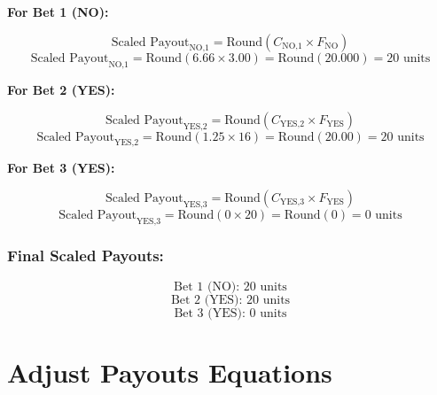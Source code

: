 \documentclass{article}
\begin{document}
\textbf{For Bet 1 (NO):}

\[
\text{Scaled Payout}_{\text{NO,1}} = \text{Round}(C_{\text{NO,1}} \times F_{\text{NO}})
\]
\[
\text{Scaled Payout}_{\text{NO,1}} = \text{Round}(6.66 \times 3.00) = \text{Round}(20.000) = 20 \text{ units}
\]

\textbf{For Bet 2 (YES):}

\[
\text{Scaled Payout}_{\text{YES,2}} = \text{Round}(C_{\text{YES,2}} \times F_{\text{YES}})
\]
\[
\text{Scaled Payout}_{\text{YES,2}} = \text{Round}(1.25 \times 16) = \text{Round}(20.00) = 20 \text{ units}
\]

\textbf{For Bet 3 (YES):}

\[
\text{Scaled Payout}_{\text{YES,3}} = \text{Round}(C_{\text{YES,3}} \times F_{\text{YES}})
\]
\[
\text{Scaled Payout}_{\text{YES,3}} = \text{Round}(0 \times 20) = \text{Round}(0) = 0 \text{ units}
\]

\subsubsection*{Final Scaled Payouts:}
\[
\text{Bet 1 (NO): } 20 \text{ units}
\]
\[
\text{Bet 2 (YES): } 20 \text{ units}
\]
\[
\text{Bet 3 (YES): } 0 \text{ units}
\]

\begin{center}
\end{center}

\section*{Adjust Payouts Equations}
\end{document}
